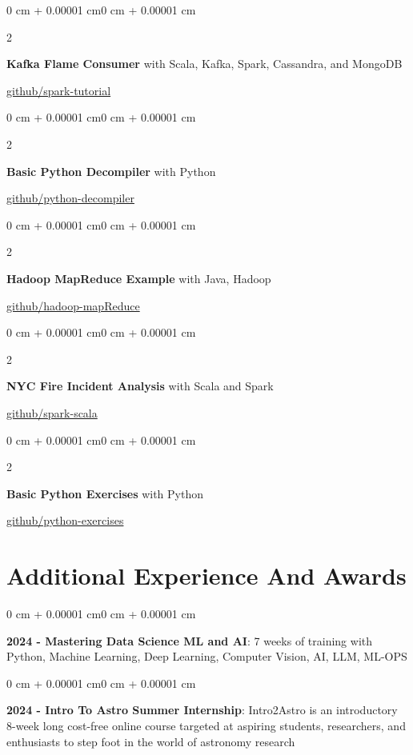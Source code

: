 \documentclass[10pt, letterpaper]{article}
\newenvironment{onecolentry}{
    \begin{adjustwidth}{0 cm + 0.00001 cm}{0 cm + 0.00001 cm}
}{
    \end{adjustwidth}}
\newenvironment{twocolentry}[2][]{
    \onecolentry
    \def\secondColumn{#2}
    \setcolumnwidth{\fill, 4.5 cm}
    \begin{paracol}{2}
}{
    \switchcolumn \raggedleft \secondColumn
    \end{paracol}
    \endonecolentry
} %
\begin{document}
        \vspace{0.10 cm}
        \begin{twocolentry}{\href{https://github.com/cevheri/spark-tutorial/blob/main/scala/src/main/scala/org/cevher/spark/KafkaFlameConsumer.scala}{github/spark-tutorial}}
            \textbf{Kafka Flame Consumer} with Scala, Kafka, Spark, Cassandra, and MongoDB
        \end{twocolentry}
        \vspace{0.10 cm}
        \begin{twocolentry}{\href{https://github.com/cevheri/python-decompiler}{github/python-decompiler}}
            \textbf{Basic Python Decompiler} with Python
        \end{twocolentry}
        \vspace{0.10 cm}
        \begin{twocolentry}{\href{https://github.com/cevheri/hadoop-mr-example-currency}{github/hadoop-mapReduce}}
            \textbf{Hadoop MapReduce Example} with Java, Hadoop
        \end{twocolentry}
        \vspace{0.10 cm}
        \begin{twocolentry}{\href{https://github.com/cevheri/spark-nyc-fire-incident}{github/spark-scala}}
            \textbf{NYC Fire Incident Analysis} with Scala and Spark
        \end{twocolentry}
        \vspace{0.10 cm}
        \begin{twocolentry}{\href{https://github.com/cevheri/python-exercises}{github/python-exercises}}
            \textbf{Basic Python Exercises} with Python
        \end{twocolentry}
        \vspace{0.10 cm}


    \section{Additional Experience And Awards}
        \begin{onecolentry}
            \textbf{2024 - Mastering Data Science ML and AI}: 7 weeks of training with Python, Machine Learning, Deep Learning, Computer Vision, AI, LLM, ML-OPS
        \end{onecolentry}
        \vspace{0.2 cm}

        \begin{onecolentry}
            \textbf{2024 - Intro To Astro Summer Internship}: Intro2Astro is an introductory 8-week long cost-free online course targeted at aspiring students, researchers, and enthusiasts to step foot in the world of astronomy research
        \end{onecolentry}
        \vspace{0.2 cm}
\end{document}
